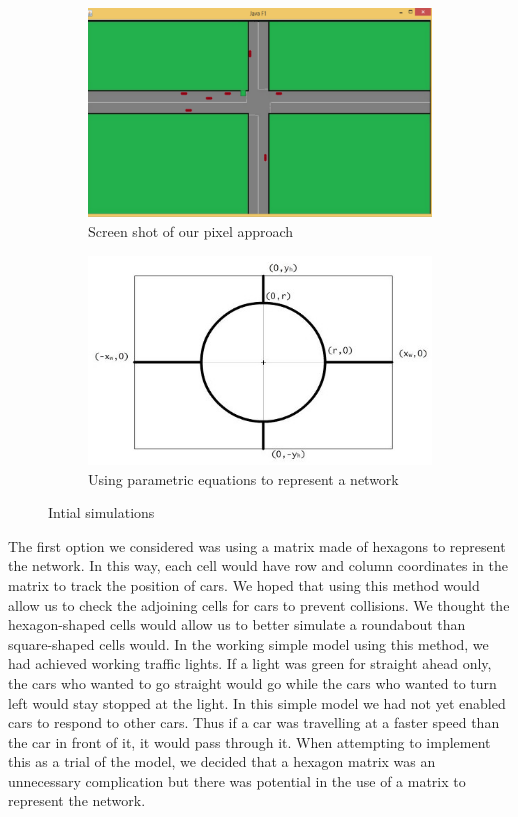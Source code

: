 \documentclass{article}
\begin{document}
\begin{figure}
	\centering
	\begin{subfigure}{5cm}
		\centering
		\includegraphics[width=1\textwidth]{ScreenShotNurSim}
		\caption{Screen shot of our pixel approach}
		\label{NursModel}
	\end{subfigure}
	\begin{subfigure}{5.5cm}
		\centering
		\includegraphics[width=1\textwidth]{KimsModel}
		\caption{Using parametric equations to represent a network}
		\label{KimModel}
	\end{subfigure}
    \caption{Intial simulations}
\end{figure}
	
	The first option we considered was using a matrix made of hexagons to represent the network. In this way, each cell would have row and column coordinates in the matrix to track the position of cars. We hoped that using this method would allow us to check the adjoining cells for cars to prevent collisions. We thought the hexagon-shaped cells would allow us to better simulate a roundabout than square-shaped cells would. In the working simple model using this method, we had achieved working traffic lights. If a light was green for straight ahead only, the cars who wanted to go straight would go while the cars who wanted to turn left would stay stopped at the light. In this simple model we had not yet enabled cars to respond to other cars. Thus if a car was travelling at a faster speed than the car in front of it, it would pass through it. When attempting to implement this as a trial of the model, we decided that a hexagon matrix was an unnecessary complication but there was potential in the use of a matrix to represent the network. 
	
\end{document}
